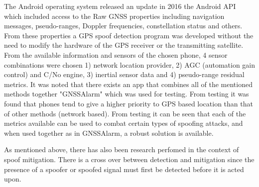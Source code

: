 The Android operating system released an update in 2016 the Android API which included access to the Raw GNSS properties including navigation messages, pseudo-ranges,
Doppler frequencies, constellation status and others. From these properties a GPS spoof detection program
was developed without the need to modify the hardware of the GPS receiver or the transmitting satellite. From the available information and sensors of the chosen phone, 4 sensor combinations were chosen 1) network location provider, 2) AGC (automation gain control) and C/No engine,
3) inertial sensor data and 4) pseudo-range residual metrics. It was noted that there exists an app that combines all of the mentioned methods together "GNSSAlarm" which was
used for testing. From testing it was found that phones tend to give a higher priority to GPS based location than that of other methods (network based). 
From testing it can be seen that each of the metrics available can be used to combat certain types of spoofing attacks, and when used together as in GNSSAlarm, 
a robust solution is available.


As mentioned above, there has also been research perfomed in the context of spoof mitigation. There is a cross over between detection and mitigation since the presence of
a spoofer or spoofed signal must first be detected before it is acted upon.

